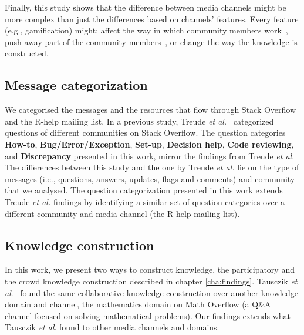 \documentclass{sig-alternate-05-2015}
\begin{document}
	Finally, this study shows that the difference between media channels might be more complex than just the differences based on channels' features. 
	Every feature (e.g., gamification) might: affect the way in which community members work~\cite{Antin2011,Singer2013}, push away part of the community members~\cite{Vasilescu2013}, or change the way the knowledge is constructed.

\subsection{Message categorization}

	We categorised the messages and the resources that flow through Stack Overflow and the R-help mailing list.
	In a previous study, Treude \textit{et al.}~\cite{Treude2011} categorized questions of different communities on Stack Overflow.
	The question categories \textbf{How-to}, \textbf{Bug/Error/Exception}, \textbf{Set-up}, \textbf{Decision help}, \textbf{Code reviewing}, and \textbf{Discrepancy} presented in this work, mirror the findings from Treude \textit{et al}. 
	The differences between this study and the one by Treude \textit{et al.} lie on the type of messages (i.e., questions, answers, updates, flags and comments) and community that we analysed. 
	The question categorization presented in this work extends Treude \textit{et al.} findings by identifying a similar set of question categories over a different community and media channel (the R-help mailing list).


\subsection{Knowledge construction}

	In this work, we present two ways to construct knowledge, the participatory and the crowd knowledge construction described in chapter \ref{cha:findings}.
	Tausczik \textit{et al}.~\cite{Tausczik2014} found the same collaborative knowledge construction over another knowledge domain and channel, the mathematics domain on Math Overflow (a Q\&A channel focused on solving mathematical problems).
	Our findings extends what Tausczik \textit{et al}. found to other media channels and domains.
\end{document}
